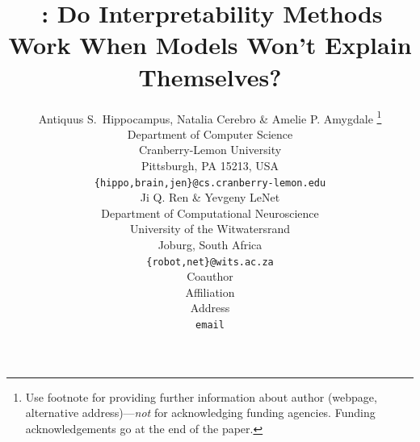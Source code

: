 \documentclass{article} %
\title{\treeicon\,\bench: Do Interpretability Methods Work When Models Won't Explain Themselves?}
\author{Antiquus S.~Hippocampus, Natalia Cerebro \& Amelie P. Amygdale \thanks{ Use footnote for providing further information
about author (webpage, alternative address)---\emph{not} for acknowledging
funding agencies.  Funding acknowledgements go at the end of the paper.} \\
Department of Computer Science\\
Cranberry-Lemon University\\
Pittsburgh, PA 15213, USA \\
\texttt{\{hippo,brain,jen\}@cs.cranberry-lemon.edu} \\
\And
Ji Q. Ren \& Yevgeny LeNet \\
Department of Computational Neuroscience \\
University of the Witwatersrand \\
Joburg, South Africa \\
\texttt{\{robot,net\}@wits.ac.za} \\
\AND
Coauthor \\
Affiliation \\
Address \\
\texttt{email}
}
\newcommand{\bench}{Pando}
\begin{document}
\ifcolmsubmission
\linenumbers
\fi

\maketitle

\begin{abstract}


\end{abstract}
\end{document}
